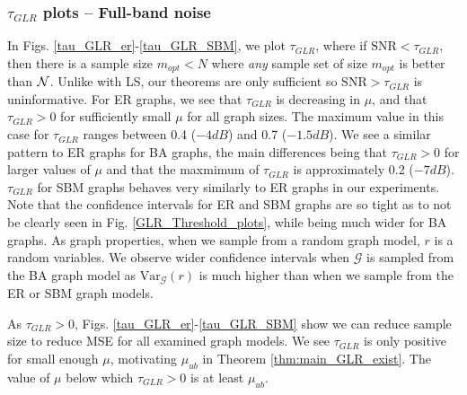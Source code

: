 \subsubsection{$\tau_{GLR}$ plots -- Full-band noise}
In Figs. \ref{tau_GLR_er}-\ref{tau_GLR_SBM}, we plot $\tau_{GLR}$, where if $\textrm{SNR} < \tau_{GLR}$, then there is a sample size $m_{opt} < N$ where \emph{any} sample set of size $m_{opt}$ is better than $\mathcal{N}$. Unlike with LS, our theorems are only sufficient so $\text{SNR} > \tau_{GLR}$ is uninformative. %
    For ER graphs, we see that $\tau_{GLR}$ is decreasing in $\mu$, and that $\tau_{GLR} > 0$ for sufficiently small $\mu$ for all graph sizes. The maximum value in this case for $\tau_{GLR}$ ranges between 0.4 ($-4dB$) and 0.7 ($-1.5dB$). %
    We see a similar pattern to ER graphs for BA graphs, the main differences being that $\tau_{GLR} > 0$ for larger values of $\mu$ and that the maxmimum of $\tau_{GLR}$ is  approximately {\color{black}0.2 ($-7dB$)}.
    $\tau_{GLR}$ for SBM graphs behaves very similarly to ER graphs in our experiments.
Note that the confidence intervals for ER and SBM graphs are so tight as to not be clearly seen in Fig. \ref{GLR_Threshold_plots}, while being much wider for BA graphs. As  graph properties, when we sample from a random graph model, $r$ is a random variables. We observe wider confidence intervals {\color{black}when $\mathcal{G}$ is sampled from the BA graph model as $\text{Var}_{\mathcal{G}}(r)$ is much higher than when we sample from the ER or SBM graph models.}

As $\tau_{GLR} > 0$, Figs. \ref{tau_GLR_er}-\ref{tau_GLR_SBM} show we can reduce sample size to reduce MSE for all examined graph models. We see $\tau_{GLR}$ is only positive for small enough $\mu$, motivating $\mu_{ub}$ in Theorem \ref{thm:main_GLR_exist}. The value of $\mu$ below which $\tau_{GLR} > 0$ is at least $\mu_{ub}$.

